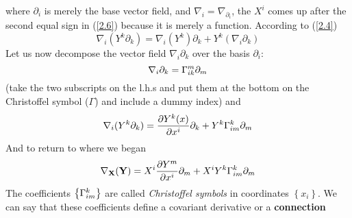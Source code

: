 where $\partial_i$ is merely the base vector field, and 
$\nabla_i = \nabla_{\partial_{i}}$, the $X^{i}$ comes up after the second equal sign in (\ref{2.6}) because it is merely
a function. According to (\ref{2.4})
\begin{equation}
 \nabla_i(Y^k \partial_k) = \nabla_i(Y^k)\partial_k + Y^k(\nabla_i \partial_k)
\end{equation}
Let us now decompose the vector field $\nabla_i \partial_k$ over the basis $\partial_i$:
\begin{equation}\label{2.7}
 \nabla_i \partial_k = \Gamma_{ik}^{m} \partial_m
\end{equation}
(take the two subscripts on the l.h.s and put them at the bottom on the Christoffel symbol ($\Gamma$) and include a 
dummy index)
and 
\begin{equation}\label{2.8}
 \nabla_i(Y^k \partial_k) = \dfrac{\partial Y^{k}(x)}{\partial x^{i}}\partial_{k} + Y^{k}\Gamma_{im}^{k} \partial_m
\end{equation}
And to return to where we began
\begin{equation}\label{2.9}
 \nabla_{\mathbf{X}}(\mathbf{Y}) = X^{i}\dfrac{\partial Y^{m}}{\partial x^{i}}\partial_{m} + 
 X^{i}Y^{k}\Gamma_{im}^{k} \partial_m
\end{equation}
The coefficients $\left\lbrace \Gamma_{im}^{k}\right\rbrace$ are called \textit{Christoffel symbols} in coordinates
$\left\lbrace x_i \right\rbrace$. We can say that these coefficients define a covariant derivative or a \textbf{connection} 
